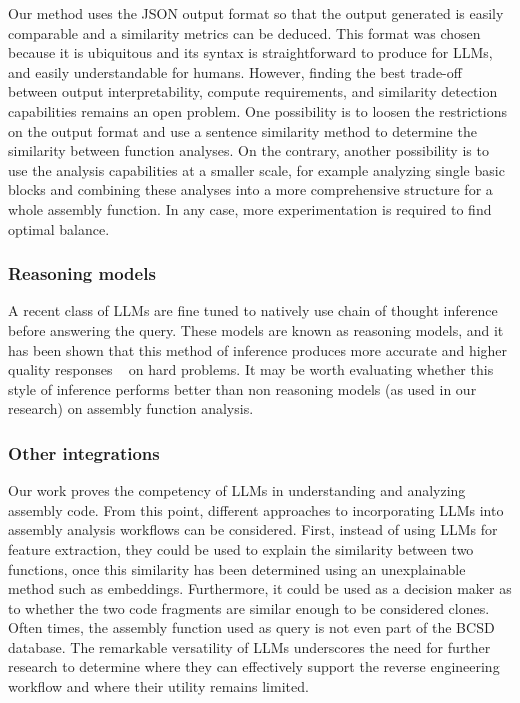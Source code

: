 Our method uses the JSON output format so that the output generated is easily comparable and a similarity metrics can be deduced.
This format was chosen because it is ubiquitous and its syntax is straightforward to produce for LLMs, and easily understandable for humans.
However, finding the best trade-off between output interpretability, compute requirements, and similarity detection capabilities remains
an open problem. One possibility is to loosen the restrictions on the output format and use a sentence similarity method to determine
the similarity between function analyses. On the contrary, another possibility is to use the analysis capabilities at a smaller scale,
for example analyzing single basic blocks and combining these analyses into a more comprehensive structure for a whole assembly function.
In any case, more experimentation is required to find optimal balance.

\subsubsection{Reasoning models}

A recent class of LLMs are fine tuned to natively use chain of thought inference ~\cite{c-o-t} before answering the query.
These models are known as reasoning models, and it has been shown that this method of inference produces more accurate and
higher quality responses ~\cite{c-o-t,reasoning,thinking-llm} on hard problems. It may be worth evaluating whether this style
of inference performs better than non reasoning models (as used in our research) on assembly function analysis.

\subsubsection{Other integrations}

Our work proves the competency of LLMs in understanding and analyzing assembly code. From this point, different approaches
to incorporating LLMs into assembly analysis workflows can be considered. First, instead of using LLMs for feature extraction,
they could be used to explain the similarity between two functions, once this similarity has been determined using an unexplainable
method such as embeddings. Furthermore, it could be used as a decision maker as to whether the two code fragments are similar enough
to be considered clones. Often times, the assembly function used as query is not even part of the BCSD database. The remarkable versatility
of LLMs underscores the need for further research to determine where they can effectively support the reverse engineering workflow and where
their utility remains limited.

